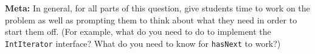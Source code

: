 \begin{solution}
\textbf{Meta:} In general, for all parts of this question, give students time
to work on the problem as well as prompting them to think about what they need
in order to start them off. (For example, what do you need to do to implement
the \lstinline$IntIterator$ interface? What do you need to know for
\lstinline$hasNext$ to work?)
\end{solution}
